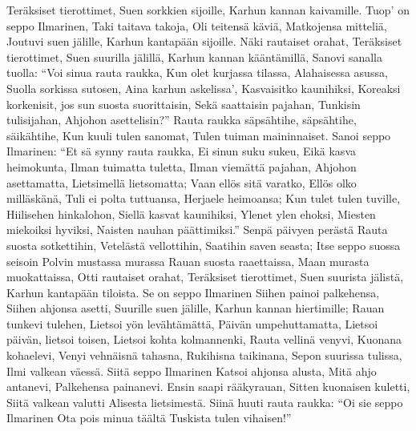     Teräksiset tierottimet,
    Suen sorkkien sijoille,
    Karhun kannan kaivamille.
  \endverse
  \beginverse
    Tuop' on seppo Ilmarinen,
    Taki taitava takoja,
    Oli teitensä käviä,
    Matkojensa mitteliä,
    Joutuvi suen jälille,
    Karhun kantapään sijoille.
    Näki rautaiset orahat,
    Teräksiset tierottimet,
    Suen suurilla jälillä,
    Karhun kannan kääntämillä,
    Sanovi sanalla tuolla:
    ``Voi sinua rauta raukka,
    Kun olet kurjassa tilassa,
    Alahaisessa asussa,
    Suolla sorkissa sutosen,
    Aina karhun askelissa',
    Kasvaisitko kaunihiksi,
    Koreaksi korkenisit,
    jos sun suosta suorittaisin,
    Sekä saattaisin pajahan,
    Tunkisin tulisijahan,
    Ahjohon asettelisin?''
  \endverse
  \beginverse
    Rauta raukka säpsähtihe,
    säpsähtihe, säikähtihe,
    Kun kuuli tulen sanomat,
    Tulen tuiman maininnaiset.
  \endverse
  \beginverse
    Sanoi seppo Ilmarinen:
    ``Et sä synny rauta raukka,
    Ei sinun suku sukeu,
    Eikä kasva heimokunta,
    Ilman tuimatta tuletta,
    Ilman viemättä pajahan,
    Ahjohon asettamatta,
    Lietsimellä lietsomatta;
    Vaan ellös sitä varatko,
    Ellös olko milläskänä,
    Tuli ei polta tuttuansa,
    Herjaele heimoansa;
    Kun tulet tulen tuville,
    Hiilisehen hinkalohon,
    Siellä kasvat kaunihiksi,
    Ylenet ylen ehoksi,
    Miesten miekoiksi hyviksi,
    Naisten nauhan päättimiksi.''
  \endverse
  \beginverse
    Senpä päivyen perästä
    Rauta suosta sotkettihin,
    Vetelästä vellottihin,
    Saatihin saven seasta;
    Itse seppo suossa seisoin
    Polvin mustassa murassa
    Rauan suosta raaettaissa,
    Maan murasta muokattaissa,
    Otti rautaiset orahat,
    Teräksiset tierottimet,
    Suen suurista jälistä,
    Karhun kantapään tiloista.
  \endverse
  \beginverse
    Se on seppo Ilmarinen
    Siihen painoi palkehensa,
    Siihen ahjonsa asetti,
    Suurille suen jälille,
    Karhun kannan hiertimille;
    Rauan tunkevi tulehen,
    Lietsoi yön levähtämättä,
    Päivän umpehuttamatta,
    Lietsoi päivän, lietsoi toisen,
    Lietsoi kohta kolmannenki,
    Rauta vellinä venyvi,
    Kuonana kohaelevi,
    Venyi vehnäisnä tahasna,
    Rukihisna taikinana,
    Sepon suurissa tulissa,
    Ilmi valkean väessä.
  \endverse
  \beginverse
    Siitä seppo Ilmarinen
    Katsoi ahjonsa alusta,
    Mitä ahjo antanevi,
    Palkehensa painanevi.
    Ensin saapi rääkyrauan,
    Sitten kuonaisen kuletti,
    Siitä valkean valutti
    Alisesta lietsimestä.
  \endverse
  \beginverse
    Siinä huuti rauta raukka:
    ``Oi sie seppo Ilmarinen
    Ota pois minua täältä
    Tuskista tulen vihaisen!''
